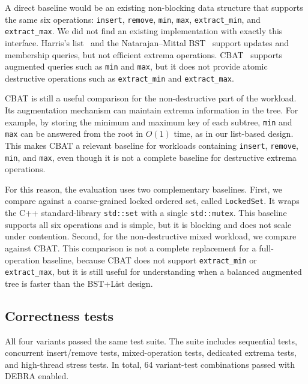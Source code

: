 \documentclass[a4paper,11pt]{article}
\newcommand{\code}[1]{\texttt{#1}}
\begin{document}
A direct baseline would be an existing non-blocking data structure that supports the same six operations: \code{insert}, \code{remove}, \code{min}, \code{max}, \code{extract\_min}, and \code{extract\_max}. We did not find an existing implementation with exactly this interface. Harris's list~\cite{harris2001pragmatic} and the Natarajan--Mittal BST~\cite{natarajan2014fast} support updates and membership queries, but not efficient extrema operations. CBAT~\cite{wrench2026cbat} supports augmented queries such as \code{min} and \code{max}, but it does not provide atomic destructive operations such as \code{extract\_min} and \code{extract\_max}.

CBAT is still a useful comparison for the non-destructive part of the workload. Its augmentation mechanism can maintain extrema information in the tree. For example, by storing the minimum and maximum key of each subtree, \code{min} and \code{max} can be answered from the root in $O(1)$ time, as in our list-based design. This makes CBAT a relevant baseline for workloads containing \code{insert}, \code{remove}, \code{min}, and \code{max}, even though it is not a complete baseline for destructive extrema operations.

For this reason, the evaluation uses two complementary baselines. First, we compare against a coarse-grained locked ordered set, called \code{LockedSet}. It wraps the C++ standard-library \code{std::set} with a single \code{std::mutex}. This baseline supports all six operations and is simple, but it is blocking and does not scale under contention. Second, for the non-destructive mixed workload, we compare against CBAT. This comparison is not a complete replacement for a full-operation baseline, because CBAT does not support \code{extract\_min} or \code{extract\_max}, but it is still useful for understanding when a balanced augmented tree is faster than the BST+List design.

\subsection{Correctness tests}

All four variants passed the same test suite. The suite includes sequential tests, concurrent insert/remove tests, mixed-operation tests, dedicated extrema tests, and high-thread stress tests. In total, 64 variant-test combinations passed with DEBRA enabled.
\end{document}
